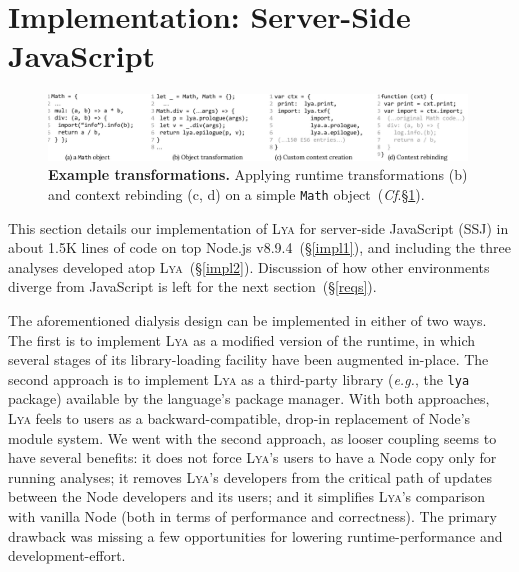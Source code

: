 \documentclass[letterpaper,twocolumn,10pt]{article}
\def\eg{{\em e.g.}, }
\newcommand{\ttt}[1]{\texttt{#1}}
\newcommand{\cf}[1]{(\emph{Cf}.\S\ref{#1})}
\newcommand{\sx}[1]{(\S\ref{#1})}
\newcommand{\sys}{{\scshape Lya}\xspace}
\begin{document}
\section{Implementation: Server-Side JavaScript}
\label{impl}

\begin{figure}[t]
\centering
\includegraphics[width=0.99\textwidth]{./figs/lya_ex2.pdf}
\vspace{-2mm}
\caption{
  \textbf{Example transformations.}
   Applying runtime transformations (b) and context rebinding (c, d) on a simple \ttt{Math} object~\cf{impl}.
}
\label{fig:ex2}
\vspace{-4mm}
\end{figure}


This section details our implementation of \sys for server-side JavaScript (SSJ) in about 1.5K lines of code on top Node.js v8.9.4~\sx{impl1}, and 
including the three analyses developed atop \sys~\sx{impl2}.
Discussion of how other environments diverge from JavaScript is left for the next section~\sx{reqs}.

The aforementioned dialysis design can be implemented in either of two ways.
The first is to implement \sys as a modified version of the runtime, in which several stages of its library-loading facility have been augmented in-place. %
The second approach is to implement \sys as a third-party library (\eg the \ttt{lya} package) available by the language's package manager.
% 
With both approaches, \sys feels to users as a backward-compatible, drop-in replacement of Node's module system.
We went with the second approach, as looser coupling seems to have several benefits:
  it does not force \sys's users to have a Node copy only for running analyses;
  it removes \sys's developers from the critical path of updates between the Node developers and its users; 
  and it simplifies \sys's comparison with vanilla Node (both in terms of performance and correctness).
The primary drawback was missing a few opportunities for lowering runtime-performance and development-effort.

\end{document}
